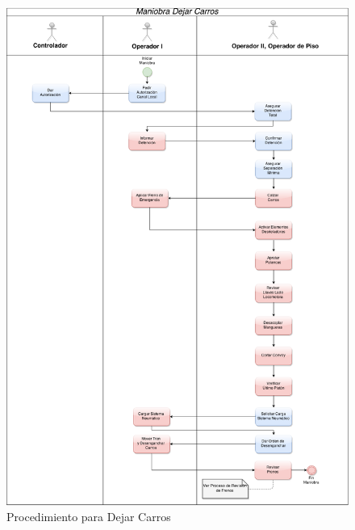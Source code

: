 \documentclass[oneside,12pt, letterpaper, titlepage]{book}
\begin{document}
\begin{appendices}
\begin{figure}[H]
    \centering
    \includegraphics[scale=0.35]{./images/MDC}
    \caption{Procedimiento para Dejar Carros}
    \label{fig:MDC}
\end{figure}


\end{appendices}
\end{document}
